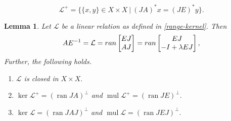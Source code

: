 \documentclass[10pt,a4paper]{amsart}
\newtheorem{lem}{Lemma}
\newcommand{\Ll}{\mathcal L}
\DeclareMathOperator{\mul}{mul}
\DeclareMathOperator{\ran}{ran}
\begin{document}
\begin{equation} \label{Krein Adjoint of L} 
\mathcal{L}^{+} = \{\{x,y\}\in X \times X~|~ (JA)^{*}x=(JE)^{*}y \}.
\end{equation} 

\begin{lem}  \label{Range representation}
 Let $\mathcal{L}$  be a linear relation as defined in \eqref{range-kernel}. Then 
 \begin{align}\label{Equation 6}
       AE^{-1}= \mathcal{L}= \textup{ran}\begin{bmatrix}
			EJ\\ AJ
			\end{bmatrix}= \textup{ran}\begin{bmatrix}
			EJ\\ -I+\lambda EJ
			\end{bmatrix},
    \end{align} 
 Further, the following holds.
 \begin{enumerate}
    \item $\mathcal{L}$ is closed in $X\times X.$
    \item $\ker\Ll^+= (\ran JA) ^\perp$ and $\mul\Ll^+= (\ran JE) ^\perp.$
    \item  $\ker\Ll= (\ran JAJ) ^\perp$ and $\mul\Ll= (\ran JEJ) ^\perp.$
\end{enumerate} 
\end{lem}
\end{document}
